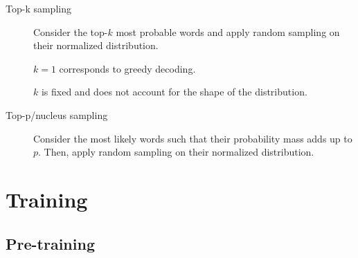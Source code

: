 \begin{description}
\begin{description}
            \item[Top-k sampling]
                Consider the top-$k$ most probable words and apply random sampling on their normalized distribution.

                \begin{remark}
                    $k=1$ corresponds to greedy decoding.
                \end{remark}

                \begin{remark}
                    $k$ is fixed and does not account for the shape of the distribution.
                \end{remark}

            \item[Top-p/nucleus sampling]
                Consider the most likely words such that their probability mass adds up to $p$. Then, apply random sampling on their normalized distribution.
        \end{description}
\end{description}



\section{Training}


\subsection{Pre-training}

